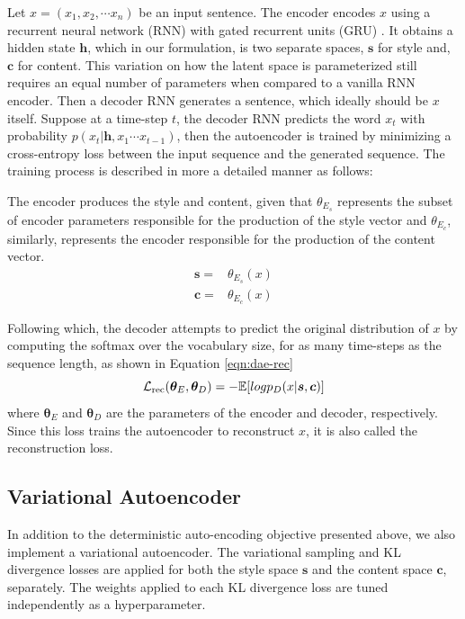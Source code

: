 Let $x=(x_1, x_2, \cdots x_n)$ be an input sentence. The encoder encodes $x$ using a recurrent neural network (RNN) with gated recurrent units (GRU) \citep{cho2014learning}. It obtains a hidden state $\bm h$, which in our formulation, is two separate spaces, $\bm s$ for style and, $\bm c$ for content. This variation on how the latent space is parameterized still requires an equal number of parameters when compared to a vanilla RNN encoder. Then a decoder RNN generates a sentence, which ideally should be $x$ itself. Suppose at a time-step $t$, the decoder RNN predicts the word $x_t$ with probability $p(x_t | \bm h, x_1 \cdots x_{t-1})$, then the autoencoder is trained by minimizing a cross-entropy loss between the input sequence and the generated sequence. The training process is described in more a detailed manner as follows:

The encoder produces the style and content, given that $\theta_{E_s}$ represents the subset of encoder parameters responsible for the production of the style vector and $\theta_{E_c}$, similarly, represents the encoder responsible for the production of the content vector.
\begin{align*}
	\bm s =
	 & \theta_{E_s}(x) \nonumber \\
	\bm c =
	 & \theta_{E_c}(x) \nonumber
\end{align*}

Following which, the decoder attempts to predict the original distribution of $x$ by computing the softmax over the vocabulary size, for as many time-steps as the sequence length, as shown in Equation \ref{eqn:dae-rec}
\begin{equation} \label{eqn:dae-rec}
	\mathcal{L}_\text{rec}(\bm\theta_E,\bm\theta_D)= -\mathbb{E}[log p_D(x|\bm s, \bm c)]
\end{equation}
where $\bm\theta_E$ and $\bm\theta_D$ are the parameters of the encoder and decoder, respectively. Since this loss trains the autoencoder to reconstruct $x$, it is also called the reconstruction loss.


\subsection{Variational Autoencoder}

In addition to the deterministic auto-encoding objective presented above, we also implement a variational autoencoder. The variational sampling and KL divergence losses are applied for both the style space $\bm s$ and the content space $\bm c$, separately. The weights applied to each KL divergence loss are tuned independently as a hyperparameter.

